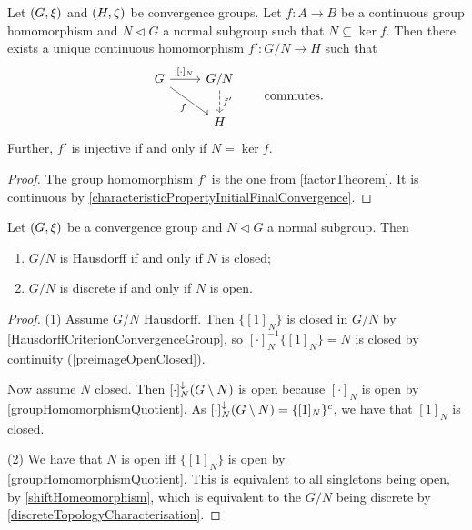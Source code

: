 \begin{lemma}
Let $\left( G, \xi \right)$ and $\left( H, \zeta \right)$ be convergence groups. Let $f: A\to B$ be a continuous group homomorphism and $N\lhd G$ a normal subgroup such that $N\subseteq \ker f$. Then there exists a unique continuous homomorphism $f': G/N \to H$ such that
\[ \begin{tikzcd}
G \arrow[r, "{[\cdot]_N}"] \arrow[dr, swap, "f"] & G/N \arrow[d, dashed, "{f'}"] \\
& H
\end{tikzcd} \qquad\text{commutes.} \]
Further, $f'$ is injective \textup{if and only if} $N = \ker f$.
\end{lemma}
\begin{proof}
The group homomorphism $f'$ is the one from \ref{factorTheorem}. It is continuous by \ref{characteristicPropertyInitialFinalConvergence}.
\end{proof}

\begin{proposition} \label{quotientConvergenceGroupProperties}
Let $\left( G, \xi \right)$ be a convergence group and $N \lhd G$ a normal subgroup. Then 
\begin{enumerate}
\item $G/N$ is Hausdorff \textup{if and only if} $N$ is closed;
\item $G/N$ is discrete \textup{if and only if} $N$ is open.
\end{enumerate}
\end{proposition}
\begin{proof}
(1) Assume $G/N$ Hausdorff. Then $\{[1]_N\}$ is closed in $G/N$ by \ref{HausdorffCriterionConvergenceGroup}, so $[\cdot]_N^{-1}\{[1]_N\} = N$ is closed by continuity (\ref{preimageOpenClosed}).

Now assume $N$ closed. Then $[\cdot]^{\downarrow}_N(G\setminus N)$ is open because $[\cdot]_N$ is open by \ref{groupHomomorphismQuotient}. As $[\cdot]^{\downarrow}_N(G\setminus N) = \{[1]_N\}^c$, we have that $[1]_N$ is closed.

(2) We have that $N$ is open iff $\{[1]_N\}$ is open by \ref{groupHomomorphismQuotient}. This is equivalent to all singletons being open, by \ref{shiftHomeomorphism}, which is equivalent to the $G/N$ being discrete by \ref{discreteTopologyCharacterisation}.
\end{proof}

